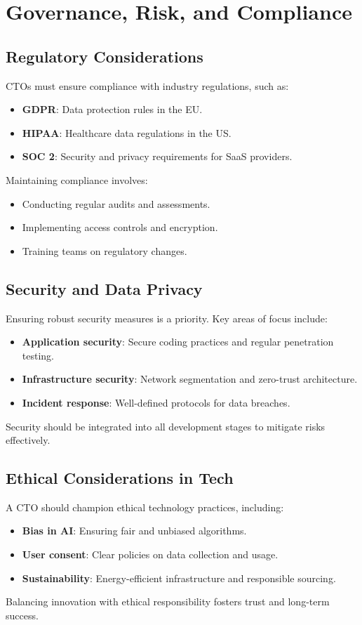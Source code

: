 \section{Governance, Risk, and Compliance}

\subsection{Regulatory Considerations}
CTOs must ensure compliance with industry regulations, such as:

\begin{itemize}
    \item \textbf{GDPR}: Data protection rules in the EU.
    \item \textbf{HIPAA}: Healthcare data regulations in the US.
    \item \textbf{SOC 2}: Security and privacy requirements for SaaS providers.
\end{itemize}

Maintaining compliance involves:
\begin{itemize}
    \item Conducting regular audits and assessments.
    \item Implementing access controls and encryption.
    \item Training teams on regulatory changes.
\end{itemize}

\subsection{Security and Data Privacy}
Ensuring robust security measures is a priority. Key areas of focus include:

\begin{itemize}
    \item \textbf{Application security}: Secure coding practices and regular penetration testing.
    \item \textbf{Infrastructure security}: Network segmentation and zero-trust architecture.
    \item \textbf{Incident response}: Well-defined protocols for data breaches.
\end{itemize}

Security should be integrated into all development stages to mitigate risks effectively.

\subsection{Ethical Considerations in Tech}
A CTO should champion ethical technology practices, including:

\begin{itemize}
    \item \textbf{Bias in AI}: Ensuring fair and unbiased algorithms.
    \item \textbf{User consent}: Clear policies on data collection and usage.
    \item \textbf{Sustainability}: Energy-efficient infrastructure and responsible sourcing.
\end{itemize}

Balancing innovation with ethical responsibility fosters trust and long-term success.

